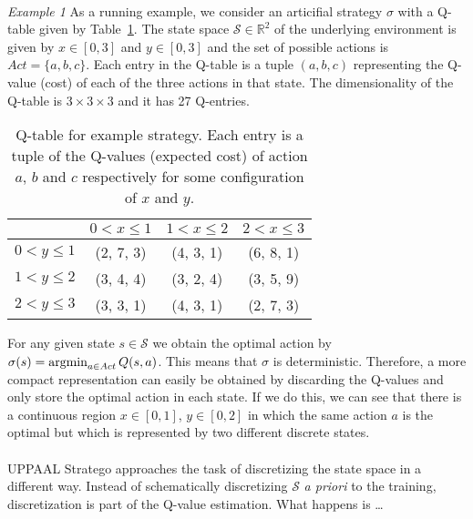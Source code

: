 \paragraph{} \textit{Example 1} As a running example, we consider an articifial
strategy $\sigma$ with a Q-table given by Table~\ref{tab:exStrategyQTable}. The
state space $\mathcal{S} \in \mathbb{R}^2 $ of the underlying environment is
given by $x \in [0,3]$ and $y \in [0,3]$ and the set of possible actions is $Act
= \{ a, b, c \}$. Each entry in the Q-table is a tuple $(a,b,c)$ representing
the Q-value (cost) of each of the three actions in that state. The
dimensionality of the Q-table is $3 \times 3 \times 3$ and it has 27 Q-entries.

\begin{table}[htpb]
    \centering
    \caption{%
        Q-table for example strategy. Each entry is a tuple of the Q-values
        (expected cost) of action $a$, $b$ and $c$ respectively for some
        configuration of $x$ and $y$.
    }\label{tab:exStrategyQTable}
    \begin{tabular}{l@{\quad}c@{\quad}c@{\quad}c}
        \toprule
         & $0 < x \le 1$ & $1 < x \le 2$ & $2 < x \le 3$ \\
        \midrule
        $0 < y \le 1$ & (2, 7, 3) & (4, 3, 1) & (6, 8, 1) \\
        $1 < y \le 2$  & (3, 4, 4) & (3, 2, 4) & (3, 5, 9) \\
        $2 < y \le 3$  & (3, 3, 1) & (4, 3, 1) & (2, 7, 3) \\
        \bottomrule
    \end{tabular}
\end{table}

For any given state $s \in \mathcal{S}$ we obtain the optimal action by
$\sigma(s) = \operatorname*{argmin}_{a \in Act} Q(s,a)$. This means that $\sigma$ is
deterministic. Therefore, a more compact representation can easily be obtained
by discarding the Q-values and only store the optimal action in each state. If
we do this, we can see that there is a continuous region $x \in [0,1]$, $y \in
[0, 2]$ in which the same action $a$ is the optimal but which is represented by
two different discrete states.

\paragraph{}
UPPAAL Stratego approaches the task of discretizing the state space in a
different way. Instead of schematically discretizing $\mathcal{S}$ \textit{a
priori} to the training, discretization is part of the Q-value estimation. What
happens is \ldots{}

